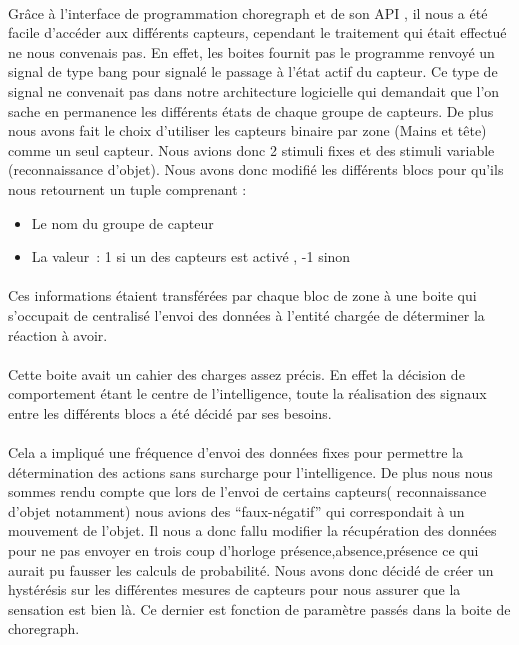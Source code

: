 
\paragraph{}
Grâce à l'interface de programmation choregraph et de son API , il nous a été
facile d'accéder aux différents capteurs, cependant le traitement qui était
effectué ne nous convenais pas. En effet, les boites fournit pas le programme
renvoyé un signal de type bang pour signalé le passage à l'état actif du
capteur. Ce type de signal ne convenait pas dans notre architecture logicielle
qui demandait que l'on sache en permanence les différents états de chaque
groupe de capteurs. De plus nous avons fait le choix d'utiliser les capteurs
binaire par zone (Mains et tête) comme un seul capteur. Nous avions donc 2 stimuli fixes et
des stimuli variable (reconnaissance d'objet). Nous avons donc modifié les
différents blocs pour qu'ils nous retournent un tuple comprenant :
\begin{itemize}
  \item Le nom du groupe de capteur
  \item La valeur~: 1 si un des capteurs est activé , -1 sinon
\end{itemize}

\paragraph{}
Ces informations étaient transférées par chaque bloc de zone à une boite qui
s'occupait de centralisé l'envoi des données à l'entité chargée de déterminer la
réaction à avoir.

\paragraph{}
Cette boite avait un cahier des charges assez précis. En effet la décision de
comportement étant le centre de l'intelligence, toute la réalisation des signaux
entre les différents blocs a été décidé par ses besoins.

\paragraph{}
Cela a impliqué une fréquence d'envoi des données fixes pour permettre la
détermination des actions sans surcharge pour l'intelligence. De plus nous
nous sommes rendu compte que lors de l'envoi de certains capteurs(
reconnaissance d'objet notamment) nous avions des ``faux-négatif'' qui
correspondait à un mouvement de l'objet. Il nous a donc fallu modifier la
récupération des données pour ne pas envoyer en trois coup d'horloge
présence,absence,présence ce qui aurait pu fausser les calculs de probabilité.
Nous avons donc décidé de créer un hystérésis sur les différentes mesures de
capteurs pour nous assurer que la sensation est bien là. Ce dernier est fonction
de paramètre passés dans la boite de choregraph.

\paragraph{}




